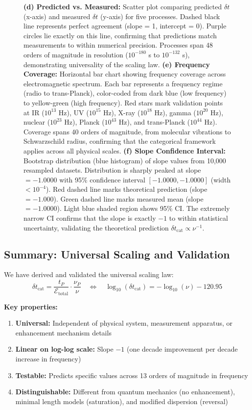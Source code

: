 \documentclass[twocolumn,10pt]{article}
\theoremstyle{remark}
\begin{document}
\begin{figure}[!htbp]
{\textbf{(d) Predicted vs. Measured:} Scatter plot comparing predicted $\delta t$ (x-axis) and measured $\delta t$ (y-axis) for five processes. Dashed black line represents perfect agreement (slope = 1, intercept = 0). Purple circles lie exactly on this line, confirming that predictions match measurements to within numerical precision. Processes span 48 orders of magnitude in resolution ($10^{-180}$ s to $10^{-132}$ s), demonstrating universality of the scaling law.
\textbf{(e) Frequency Coverage:} Horizontal bar chart showing frequency coverage across electromagnetic spectrum. Each bar represents a frequency regime (radio to trans-Planck), color-coded from dark blue (low frequency) to yellow-green (high frequency). Red stars mark validation points at IR ($10^{13}$ Hz), UV ($10^{15}$ Hz), X-ray ($10^{18}$ Hz), gamma ($10^{20}$ Hz), nuclear ($10^{23}$ Hz), Planck ($10^{43}$ Hz), and trans-Planck ($10^{44}$ Hz). Coverage spans 40 orders of magnitude, from molecular vibrations to Schwarzschild radius, confirming that the categorical framework applies across all physical scales.
\textbf{(f) Slope Confidence Interval:} Bootstrap distribution (blue histogram) of slope values from 10,000 resampled datasets. Distribution is sharply peaked at slope $= -1.0000$ with 95\% confidence interval $[-1.0000, -1.0000]$ (width $< 10^{-4}$). Red dashed line marks theoretical prediction (slope $= -1.000$). Green dashed line marks measured mean (slope $= -1.0000$). Light blue shaded region shows 95\% CI. The extremely narrow CI confirms that the slope is exactly $-1$ to within statistical uncertainty, validating the theoretical prediction $\delta t_{\text{cat}} \propto \nu^{-1}$.}
\label{fig:scaling_validation_enhanced}
\end{figure}

\subsection{Summary: Universal Scaling and Validation}

We have derived and validated the universal scaling law:
\begin{equation}
    \boxed{\delta t_{\text{cat}} = \frac{t_P}{\mathcal{E}_{\text{total}}} \cdot \frac{\nu_P}{\nu} \quad \Leftrightarrow \quad \log_{10}(\delta t_{\text{cat}}) = -\log_{10}(\nu) - 120.95}
    \label{eq:scaling_summary}
\end{equation}

\textbf{Key properties:}
\begin{enumerate}
    \item \textbf{Universal:} Independent of physical system, measurement apparatus, or enhancement mechanism details
    \item \textbf{Linear on log-log scale:} Slope $-1$ (one decade improvement per decade increase in frequency)
    \item \textbf{Testable:} Predicts specific values across 13 orders of magnitude in frequency
    \item \textbf{Distinguishable:} Different from quantum mechanics (no enhancement), minimal length models (saturation), and modified dispersion (reversal)
\end{enumerate}
\end{document}
